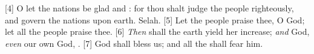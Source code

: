 [4] \textcolor[cmyk]{0.99998,1,0,0}{O let the nations be glad and : for thou shalt judge the people righteously, and govern the nations upon earth. Selah.} %
[5] \textcolor[cmyk]{0.99998,1,0,0}{Let the people praise thee, O God; let all the people praise thee.}
[6] \textcolor[cmyk]{0.99998,1,0,0}{\emph{Then} shall the earth yield her increase; \emph{and} God, \emph{even} our own God, .}
[7] \textcolor[cmyk]{0.99998,1,0,0}{God shall bless us; and all the  shall fear him.}